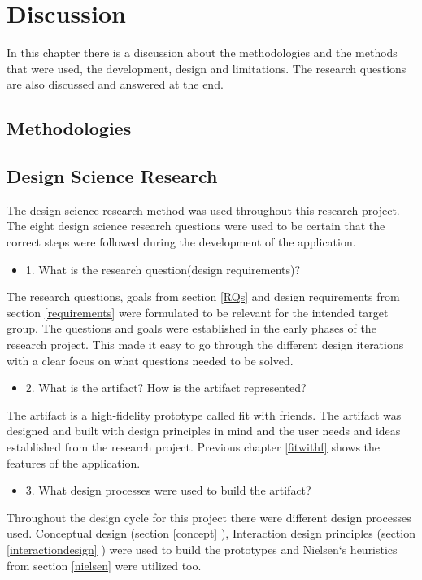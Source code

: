 \chapter{Discussion}
In this chapter there is a discussion about the methodologies and the methods that were used, the development, design and limitations. The research questions are also discussed and answered at the end. 
\section{Methodologies}

\section{Design Science Research}
The design science research method was used throughout this research project. The eight design science research questions were used to be certain that the correct steps were followed during the development of the application. 
\begin{itemize}
    \item 1. What is the research question(design requirements)? 
\end{itemize}
 The research questions, goals   from section \ref{RQs} and design requirements from section \ref{requirements} were formulated to be relevant for the intended target group. The questions and goals were established in the early phases of the research project. This made it easy to go through the different design iterations with a clear focus on what questions needed to be solved. 
\begin{itemize}
    \item 2. What is the artifact? How is the artifact represented?
\end{itemize}
The artifact is a high-fidelity prototype called fit with friends. The artifact was designed and built with design principles in mind and the user needs and ideas established from the research project.  Previous chapter \ref{fitwithf} shows the features of the application.
\begin{itemize}
    \item 3. What design processes were used to build the artifact? 
\end{itemize}
Throughout the design cycle for this project there were different design processes used. Conceptual design (section \ref{concept} ), Interaction design principles (section \ref{interactiondesign} ) were used to build the prototypes and Nielsen`s heuristics from section \ref{nielsen} were utilized too.

